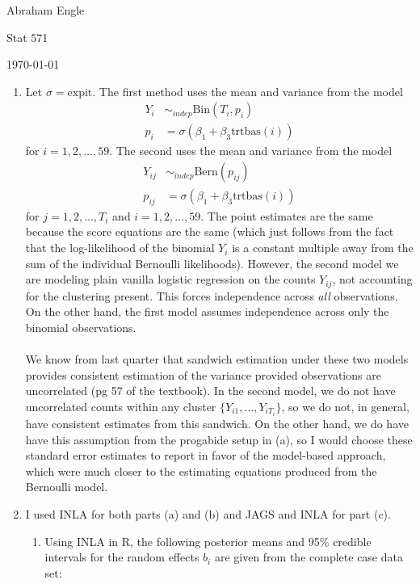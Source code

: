 \documentclass[11pt]{article}
\begin{document}
\pagestyle{empty}
\hfill Abraham Engle

\hfill Stat 571

\hfill \today
\begin{enumerate}
	\item Let $\sigma=\mathrm{expit}$. The first method uses the mean and variance from the model
	\begin{align*}
		Y_i &\sim_{indep} \mathrm{Bin}(T_i,p_i) \\
		p_i &= \sigma(\beta_1 + \beta_3\mathrm{trtbas}(i))
	\end{align*}
	for $i=1,2,\dotsc,59$. The second uses the mean and variance from the model
	\begin{align*}
		Y_{ij} &\sim_{indep} \mathrm{Bern}(p_{ij}) \\
		p_{ij} &= \sigma(\beta_1 + \beta_3\mathrm{trtbas}(i))
	\end{align*} 
	for $j=1,2,\dotsc,T_i$ and $i=1,2,\dotsc,59$. The point estimates are the same because the score equations are the same (which just follows from the fact that the log-likelihood of the binomial $Y_i$ is a constant multiple away from the sum of the individual Bernoulli likelihoods). However, the second model we are modeling plain vanilla logistic regression on the counts $Y_{ij}$, not accounting for the clustering present. This forces independence across \emph{all} observations. On the other hand, the first model assumes independence across only the binomial observations. \\ \\We know from last quarter that sandwich estimation under these two models provides consistent estimation of the variance provided observations are uncorrelated (pg 57 of the textbook). In the second model, we do not have uncorrelated counts within any cluster $\{Y_{i1},\dotsc,Y_{iT_i}\}$, so we do not, in general, have consistent estimates from this sandwich. On the other hand, we do have have this assumption from the progabide setup in (a), so I would choose these standard error estimates to report in favor of the model-based approach, which were much closer to the estimating equations produced from the Bernoulli model.
	\item I used INLA for both parts (a) and (b) and JAGS and INLA for part (c).
	\begin{enumerate}
		\item Using INLA in R, the following posterior means and 95\% credible intervals for the random effects $b_i$ are given from the complete case data set:
		\begin{figure}[H]

\end{figure}
\end{enumerate}
\end{enumerate}
\end{document}
